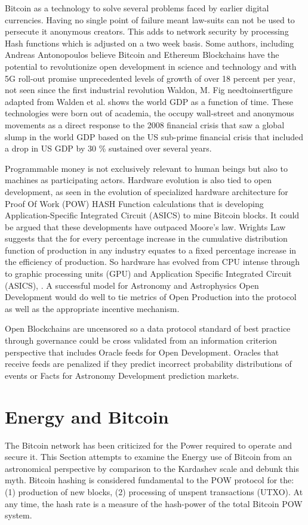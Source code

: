 \documentclass[final,5p,times,twocolumn,authoryear]{elsarticle}
\begin{document}
Bitcoin as a technology to solve several problems faced by earlier digital currencies. Having no single point of failure meant law-suits can not be used to persecute it anonymous creators. This adds to network security by processing Hash functions which is adjusted on a two week basis. Some authors, including Andreas Antonopoulos believe Bitcoin and Ethereum Blockchains have the potential to revolutionize open development in science and technology and with 5G roll-out promise unprecedented levels of growth of over 18 percent per year, not seen since the first industrial revolution Waldon, M.  Fig needtoinsertfigure adapted from Walden et al. shows the world GDP as a function of time. These technologies were born out of academia, the occupy wall-street and anonymous movements as a direct response to the 2008 financial crisis that saw a global slump in the world GDP based on the US sub-prime financial crisis  that included a drop in US GDP by 30 \% sustained over several years.
 
Programmable money is not exclusively relevant to human beings but also to machines as participating actors. Hardware evolution is also tied to open development, as seen in the evolution of specialized hardware architecture for Proof Of Work (POW) HASH Function calculations that is developing Application-Specific Integrated Circuit (ASICS) to mine Bitcoin blocks. It could be argued that these developments have outpaced Moore's law.  Wrights Law suggests that the for every percentage increase in the cumulative distribution function of production in any industry equates to a fixed percentage increase in the efficiency of production. So hardware has evolved from CPU intense through to graphic processing units (GPU) and  Application Specific Integrated Circuit  (ASICS), \cite{10.1371/journal.pone.0052669}. A successful model for Astronomy and Astrophysics Open Development would do well to tie metrics of Open Production into the protocol as well as the appropriate incentive mechanism.       

Open Blockchains are uncensored so a data protocol standard of best practice through governance could be cross validated from an information criterion perspective that includes Oracle feeds for Open Development.  Oracles that receive feeds are penalized if they predict incorrect probability distributions of events or Facts for Astronomy Development prediction markets. 

\section{Energy and Bitcoin}
\label{sec:energy}
The Bitcoin network has been criticized for the Power required to operate and secure it. This Section attempts to examine the Energy use of Bitcoin from an astronomical perspective by comparison to the Kardashev \cite{kar64} scale and debunk this myth. Bitcoin hashing is considered fundamental to the POW protocol for the: (1) production of new blocks, (2) processing of unspent transactions (UTXO). At any time, the hash rate is a measure of the hash-power of the total Bitcoin POW system.  
\end{document}
